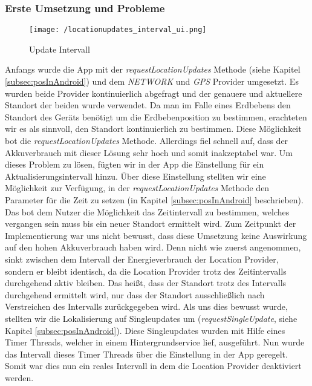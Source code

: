 \subsubsection{Erste Umsetzung und Probleme}
\begin{wrapfigure}{r}{50mm}
\centering
   \vspace{-4mm}
   \texttt{[image: /locationupdates\_interval\_ui.png]} 
   \vspace{-10mm}
   \caption[Lokalisierung: Update Intervall]{Update Intervall}
   \vspace{-5mm}
\end{wrapfigure}
Anfangs wurde die App mit der \textit{requestLocationUpdates} Methode (siehe Kapitel \ref{subsec:posInAndroid}) und dem \textit{NETWORK} und \textit{GPS} Provider umgesetzt. Es wurden beide Provider kontinuierlich abgefragt und der genauere
und aktuellere Standort der beiden wurde verwendet. Da man im Falle eines Erdbebens den Standort des Geräts benötigt um die Erdbebenposition zu bestimmen, erachteten wir es als sinnvoll, den Standort kontinuierlich zu bestimmen. Diese Möglichkeit bot die \textit{requestLocationUpdates} Methode. Allerdings fiel schnell auf, dass der Akkuverbrauch mit dieser Lösung sehr hoch und somit inakzeptabel war. Um dieses Problem zu lösen, fügten wir in der App die Einstellung für ein Aktualisierungsintervall hinzu. Über diese Einstellung stellten wir eine Möglichkeit zur Verfügung, in der \textit{requestLocationUpdates} Methode den Parameter für die Zeit zu setzen (in Kapitel \ref{subsec:posInAndroid} beschrieben). Das bot dem Nutzer die Möglichkeit das Zeitintervall zu bestimmen, welches vergangen sein muss bis ein neuer Standort ermittelt wird. Zum Zeitpunkt der Implementierung war uns nicht bewusst, dass diese Umsetzung keine Auswirkung auf den hohen Akkuverbrauch haben wird. Denn nicht wie zuerst angenommen, sinkt zwischen dem Intervall der Energieverbrauch der Location Provider, sondern er bleibt identisch, da die Location Provider trotz des Zeitintervalls durchgehend aktiv bleiben.
Das heißt, dass der Standort trotz des Intervalls durchgehend ermittelt wird, nur dass der Standort ausschließlich nach Verstreichen des Intervalls zurückgegeben wird.
Als uns dies bewusst wurde, stellten wir die Lokalisierung auf Singleupdates um (\textit{requestSingleUpdate}, siehe Kapitel \ref{subsec:posInAndroid}). Diese Singleupdates wurden mit Hilfe eines Timer Threads, welcher in einem Hintergrundservice lief, ausgeführt. Nun wurde das Intervall dieses Timer Threads über die Einstellung in der App geregelt. Somit war dies nun ein reales Intervall in dem die Location Provider deaktiviert werden. 
